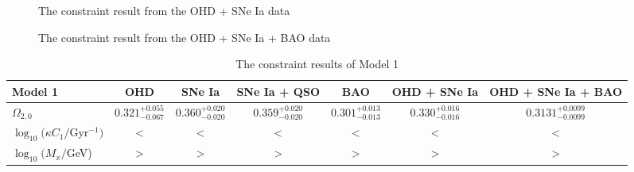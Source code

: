 \documentclass[twocolumn]{aastex631}
\begin{document}
   \begin{figure}[htbp]
      \centering
      \caption{The constraint result from the OHD + SNe Ia data}
   \end{figure}

   \begin{figure}[htbp]
      \centering
      \caption{The constraint result from the OHD + SNe Ia + BAO data}
   \end{figure}

   \begin{table}[htbp]
      \caption{The constraint results of Model 1}
      \centering
      \begin{tabular}{lcccccc}
         \hline\hline
         Model 1 & OHD & SNe Ia & SNe Ia + QSO & BAO &
          OHD + SNe Ia & OHD + SNe Ia + BAO \\
         \hline
         $\Omega_{2,0}$ & $0.321_{-0.067}^{+0.055}$ & $0.360_{-0.020}^{+0.020}$
          & $0.359_{-0.020}^{+0.020}$ & $0.301_{-0.013}^{+0.013}$
          & $0.330_{-0.016}^{+0.016}$ & $0.3131_{-0.0099}^{+0.0099}$ \\
         $\log_{10}(\kappa C_1/$Gyr${}^{-1})$ & < & < & < & < & < & < \\
         $\log_{10}(M_x/$GeV) & > & > & > & > & > & > \\
         \hline
      \end{tabular}
      \label{tab:5}
   \end{table}
\end{document}
